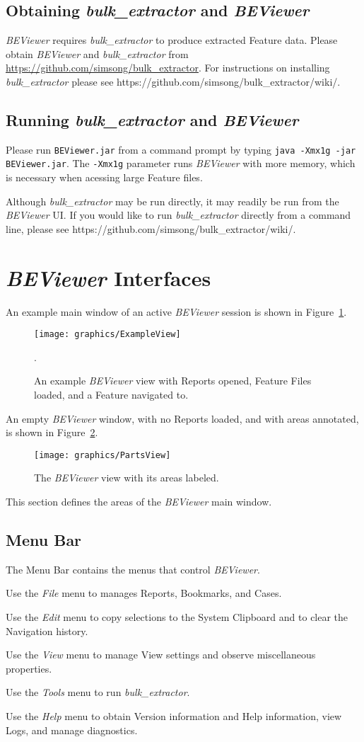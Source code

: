 \documentclass[10pt,twoside]{article}
\newcommand{\bulk}{\emph{bulk\_extractor}\xspace}
\newcommand{\bev}{\emph{BEViewer}\xspace}
\begin{document}
\subsection{Obtaining \bulk and \bev}
\bev requires \bulk to produce extracted \gls{Feature} data.
Please obtain \bev and \bulk from \url{https://github.com/simsong/bulk\_extractor}.
For instructions on installing \bulk please see https://github.com/simsong/bulk\_extractor/wiki/.

\subsection{Running \bulk and \bev}
Please run \texttt{BEViewer.jar} from a command prompt
by typing \texttt{java -Xmx1g -jar BEViewer.jar}.
The \texttt{-Xmx1g} parameter runs \bev with more memory,
which is necessary when acessing large Feature files.

Although \bulk may be run directly, it may readily be run from the \bev UI.
If you would like to run \bulk directly from a command line,
please see https://github.com/simsong/bulk\_extractor/wiki/.

\section{\bev Interfaces}
An example main window of an active \bev session is shown in Figure~\ref{main-window-example}.
\begin{figure}
\center
\texttt{[image: graphics/ExampleView]}
\caption{An example \bev view with Reports opened, Feature Files loaded,
and a Feature navigated to.\label{main-window-example}}.
\end{figure}
An empty \bev window, with no Reports loaded, and with areas annotated,
is shown in Figure~\ref{main-window-parts}.
\begin{figure}
\center
\texttt{[image: graphics/PartsView]}
\caption{The \bev view with its areas labeled.\label{main-window-parts}}
\end{figure}

This section defines the areas of the \bev main window.
\subsection{Menu Bar}
The Menu Bar contains the menus that control \bev.
\begin{compactitem}
\item Use the \emph{File} menu to manages Reports, Bookmarks, and Cases.
\item Use the \emph{Edit} menu to copy selections to the System Clipboard
and to clear the Navigation history.
\item Use the \emph{View} menu to manage View settings and observe miscellaneous properties.
\item Use the \emph{Tools} menu to run \bulk.
\item Use the \emph{Help} menu to obtain Version information and Help information,
view \glspl{Log},
and manage diagnostics.
\end{compactitem}
\end{document}
